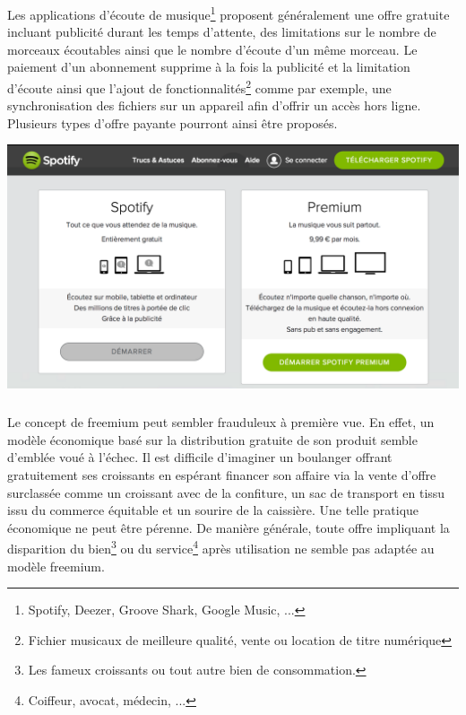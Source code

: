 \documentclass[11pt, a4paper ]{article}
\begin{document}
\begin{spacing}{1.5}
\subsubparagraph{}
Les applications d'écoute de musique\footnote{Spotify, Deezer, Groove Shark, Google Music, ...} proposent généralement une offre gratuite incluant publicité durant les temps d'attente, des limitations sur le nombre de morceaux écoutables ainsi que le nombre d'écoute d'un même morceau.
Le paiement d'un abonnement supprime à la fois la publicité et la limitation d'écoute ainsi que l'ajout de fonctionnalités\footnote{Fichier musicaux de meilleure qualité, vente ou location de titre numérique} comme par exemple, une synchronisation des fichiers sur un appareil afin d'offrir un accès hors ligne. Plusieurs types d'offre payante pourront ainsi être proposés.


\begin{center}
	\includegraphics[width=\textwidth]{images/media/premiumSpotify.png}
\end{center}

\paragraph{} %
	\subparagraph{} %
Le concept de freemium peut sembler frauduleux à première vue. En effet, un modèle économique basé sur la distribution gratuite de son produit semble d’emblée voué à l'échec. Il est difficile d'imaginer un boulanger offrant gratuitement ses croissants en espérant financer son affaire via la vente d'offre surclassée comme un croissant avec de la confiture, un sac de transport en tissu issu du commerce équitable et un sourire de la caissière. Une telle pratique économique ne peut être pérenne. De manière générale, toute offre impliquant la disparition du bien\footnote{Les fameux croissants ou tout autre bien de consommation.} ou du service\footnote{Coiffeur, avocat, médecin, ...} après utilisation ne semble pas adaptée au modèle freemium.


\end{spacing}
\end{document}
